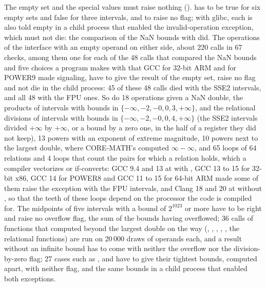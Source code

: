 \medskip
The empty set and the special values must raise nothing
().  has to be true for six
empty sets and false for three intervals, and to raise no flag; with glibc,
each is also told empty in a child process that enabled the
invalid-operation exception, which must not die: the comparison of the NaN
bounds with \code{<=} did. The operations of the interface with an empty
operand on either side, about 220 calls in 67 checks, among them one for each
of the 48 calls that compared the NaN bounds and five choices a program makes
with  that GCC for 32-bit ARM and for POWER9 made signaling,
have to give the result of the empty set, raise no flag and not die in the
child process: 45 of these 48 calls died with the SSE2 intervals, and all 48
with the FPU ones.\newinvfive{} So do 18 operations given a NaN double, the products of
intervals with bounds in $\{-\infty, -2, -0, 0, 3, +\infty\}$, and the relational
divisions of intervals with bounds in $\{-\infty, -2, -0, 0, 4, +\infty\}$ (the SSE2 intervals divided $+\infty$
by $+\infty$, or a bound by a zero one, in the half of a register they did
not keep), 13 powers with an exponent of extreme magnitude, 10 powers next to
the largest double, where CORE-MATH's  computed $\infty-\infty$,
and 65 loops of 64 relations and 4 loops that count the pairs for which a
relation holds, which a compiler vectorizes or if-converts: GCC 9.4 and 13 at
 with , GCC 13 to 15 for 32-bit x86, GCC 14 for
POWER8 and GCC 11 to 15 for 64-bit ARM made some of them raise the
exception with the FPU intervals, and Clang 18 and 20 at
 without , so that the
teeth of these loops depend on the processor the code is compiled for. The
midpoints of five intervals with a bound of $2^{1023}$ or more have to be
right and raise no overflow flag, the sum of the bounds having overflowed;
36 calls of functions that computed beyond the largest double on the way
(, , , ,
, the relational functions) are run on 20\,000 draws of operands
each, and a result without an infinite bound has to come with neither the
overflow nor the division-by-zero flag;\newinvfive{} 27 cases such as
,  and
 have to give their tightest
bounds, computed apart, with neither flag, and the same bounds in a child
process that enabled both exceptions.

